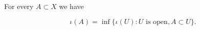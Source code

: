 For every $A \subset X$ we have

$$\iota(A) = \inf \{ \iota(U) : U \text{ is open}, A \subset U \}.$$
